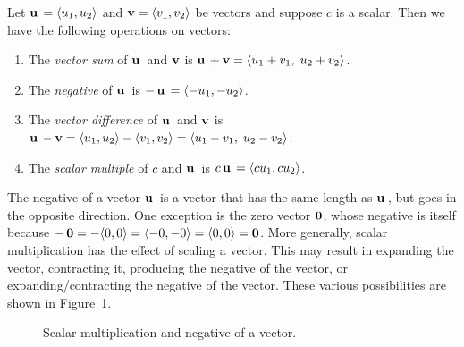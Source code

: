 \begin{definition}
\label{def:vectors_matrices:vector_operations}
Let $\operatorname*{\mathbf{u}}{} = \langle u_1, u_2 \rangle$ and
$\operatorname*{\mathbf{v}} = \langle v_1, v_2 \rangle$ be vectors and suppose
$c$ is a scalar. Then we have the following operations on vectors:
\begin{enumerate}
\item The \emph{vector sum} of $\operatorname*{\mathbf{u}}{}$ and
  $\operatorname*{\mathbf{v}}$ is $\operatorname*{\mathbf{u}}{} + \operatorname*{\mathbf{v}} = \langle u_1 + v_1,\; u_2 + v_2 \rangle$.

\item The \emph{negative} of $\operatorname*{\mathbf{u}}{}$ is
  $-\operatorname*{\mathbf{u}}{} = \langle -u_1, -u_2 \rangle$.

\item The \emph{vector difference} of $\operatorname*{\mathbf{u}}{}$ and
  $\operatorname*{\mathbf{v}}$ is $\operatorname*{\mathbf{u}}{} - \operatorname*{\mathbf{v}} =
  \langle u_1, u_2 \rangle - \langle v_1, v_2 \rangle = \langle u_1 -
  v_1,\; u_2 - v_2 \rangle$.

\item The \emph{scalar multiple} of $c$ and
  $\operatorname*{\mathbf{u}}{}$ is $c\operatorname*{\mathbf{u}}{} = \langle c u_1, c u_2 \rangle$.
\end{enumerate}
\end{definition}

The negative of a vector $\operatorname*{\mathbf{u}}{}$ is a vector that has the same
length as $\operatorname*{\mathbf{u}}{}$, but goes in the opposite direction. One
exception is the zero vector $\operatorname*{\textbf{0}}$, whose negative is itself
because $-\operatorname*{\textbf{0}} = -\langle 0,0 \rangle = \langle -0, -0 \rangle =
\langle 0,0 \rangle = \operatorname*{\textbf{0}}$. More generally, scalar
multiplication has the effect of scaling a vector. This may result in
expanding the vector, contracting it, producing the negative of the
vector, or expanding/contracting the negative of the vector. These
various possibilities are shown in
Figure~\ref{fig:scalar_multiply_negative}.

\begin{figure}[!htpb]
\centering
{}
\caption{Scalar multiplication and negative of a vector.}
\label{fig:scalar_multiply_negative}
\end{figure}


